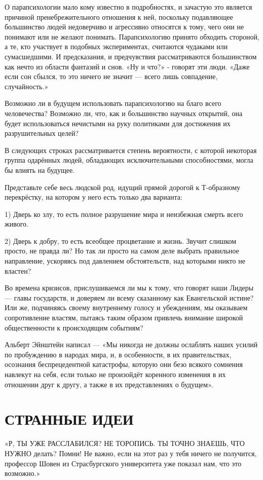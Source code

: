 \documentclass[a5paper, 9pt,
final, openany, twoside=true]{memoir}
\begin{document}
О парапсихологии мало кому известно в подробностях, и зачастую это является причиной пренебрежительного отношения к ней, поскольку подавляющее большинство людей недоверчиво и агрессивно относятся к тому, чего они не понимают или не желают понимать. Парапсихологию принято обходить стороной, а те, кто участвует в подобных экспериментах, считаются чудаками или сумасшедшими. И предсказания, и предчувствия рассматриваются большинством как нечто из области фантазий и снов. «Ну и что?» - говорят эти люди. «Даже если сон сбылся, то это ничего не значит — всего лишь совпадение, случайность.»\bigskip

Возможно ли в будущем использовать парапсихологию на благо всего человечества? Возможно ли, что, как и большинство научных открытий, она будет использоваться нечистыми на руку политиками для достижения их разрушительных целей?\bigskip

В следующих строках рассматривается степень вероятности, с которой некоторая группа одарённых людей, обладающих исключительными способностями, могла бы влиять на будущее.\bigskip

Представьте себе весь людской род, идущий прямой дорогой к Т-образному перекрёстку, на котором у него есть только два варианта:\bigskip

1) Дверь ко злу, то есть полное разрушение мира и неизбежная смерть всего живого.\bigskip

2) Дверь к добру, то есть всеобщее процветание и жизнь.
Звучит слишком просто, не правда ли? Но так ли просто на самом деле выбрать правильное направление, ускоряясь под давлением обстоятельств, над которыми никто не властен?\bigskip

Во времена кризисов, прислушиваемся ли мы к тому, что говорят наши Лидеры — главы государств, и доверяем ли всему сказанному как Евангельской истине? Или же, подчиняясь своему внутреннему голосу и убеждениям, мы оказываем сопротивление властям, пытаясь таким образом привлечь внимание широкой общественности к происходящим событиям?\bigskip

Альберт Эйнштейн написал — «Мы никогда не должны ослаблять наших усилий по пробуждению в народах мира, и, в особенности, в их правительствах, осознания беспрецедентной катастрофы, которую они безо всякого сомнения навлекут на себя, если только не произойдёт коренного изменения в их отношении друг к другу, а также в их представлениях о будущем».\bigskip
\chapter{СТРАННЫЕ ИДЕИ}
«Р{, ТЫ УЖЕ РАССЛАБИЛСЯ? НЕ ТОРОПИСЬ. ТЫ ТОЧНО ЗНАЕШЬ, ЧТО НУЖНО} делать? Помни! Не важно, если на этот раз у тебя ничего не получится, профессор Шовен из Страсбургского университета уже показал нам, что это возможно.»
\end{document}
